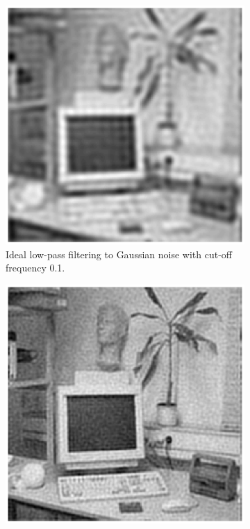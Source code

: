 \documentclass[11pt,a4paper]{article}
\begin{document}
\begin{itemize}
	\begin{figure}[!ht]
		\centering 
		\begin{subfigure}[t]{.32\linewidth} %
			\includegraphics[width=\columnwidth]{Q17_Lowpass_to_Gauss_0_1.eps}
			\caption{\scriptsize Ideal low-pass filtering to Gaussian noise with cut-off frequency 0.1.}
			\label{fig:lowpassToGauss0.1}
		\end{subfigure}
		\begin{subfigure}[t]{.32\linewidth} %
			\includegraphics[width=\columnwidth]{Q17_Lowpass_to_Gauss_0_25.eps}

\end{subfigure}
\end{figure}
\end{itemize}
\end{document}
